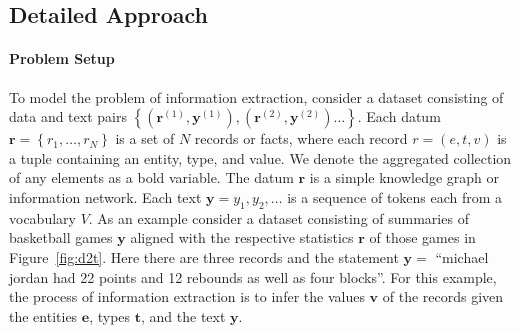 \documentclass[12pt]{article}
\newcommand\set[1]{\left\{#1\right\}}
\newcommand{\ba}{\mathbf{a}}
\newcommand{\be}{\mathbf{e}}
\newcommand{\br}{\mathbf{r}}
\newcommand{\bt}{\mathbf{t}}
\newcommand{\bv}{\mathbf{v}}
\newcommand{\by}{\mathbf{y}}
\begin{document}









\subsection*{Detailed Approach}


\paragraph{Problem Setup}
To model the problem of information extraction,  
consider a dataset consisting of data and text pairs
$\set{(\br^{(1)}, \by^{(1)}),(\br^{(2)},\by^{(2)})\ldots}$.
Each datum $\br = \set{r_1,\ldots,r_N}$ is a set of $N$ records or facts, where each record $r = (e, t, v)$
is a tuple containing an entity, type, and value.
We denote the aggregated collection of any elements as a bold variable.
The datum $\br$ is a simple knowledge graph or information network. 
Each text $\by = y_1,y_2,\ldots$ is a sequence of tokens each from a vocabulary $V$. As an example consider a dataset consisting of summaries of basketball games $\by$ aligned with the respective statistics $\br$ of those games in Figure~\ref{fig:d2t}. 
Here there are three records and the statement $\by = $ ``michael jordan had 22 points and 12 rebounds as well as four blocks''. For this example, the process of information extraction is to infer 
the values $\bv$ of the records given the entities $\be$, types $\bt$, and the text $\by$.
\end{document}
